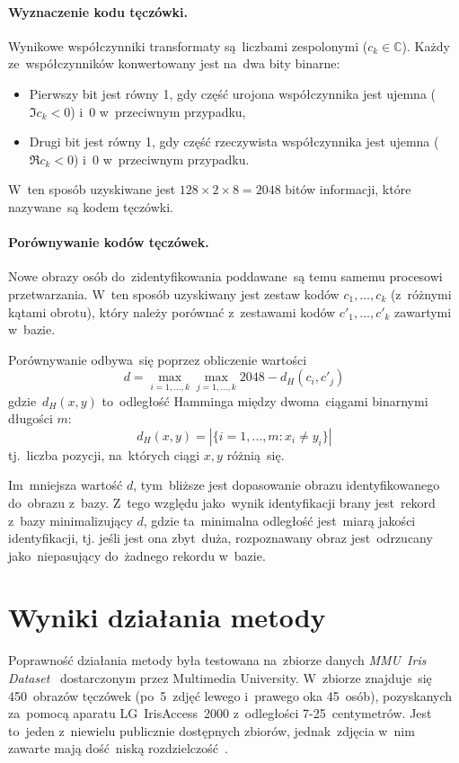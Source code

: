 \documentclass[11pt,a4paper]{article}
\begin{document}
\paragraph{Wyznaczenie kodu tęczówki.}
Wynikowe współczynniki transformaty są~liczbami zespolonymi ($c_k \in \mathbb{C}$).
Każdy ze~współczynników konwertowany jest na~dwa bity binarne:
\begin{itemize}
    \item Pierwszy bit jest równy 1, gdy część urojona współczynnika jest ujemna ($\Im c_k < 0$) i~0 w~przeciwnym przypadku,
    \item Drugi bit jest równy 1, gdy część rzeczywista współczynnika jest ujemna ($\Re c_k < 0$) i~0 w~przeciwnym przypadku.
\end{itemize}
W~ten sposób uzyskiwane jest $128 \times 2 \times 8 = 2048$ bitów informacji, które nazywane~są kodem tęczówki.

\paragraph{Porównywanie kodów tęczówek.}
Nowe obrazy osób do~zidentyfikowania poddawane~są temu samemu procesowi przetwarzania.
W~ten sposób uzyskiwany jest zestaw kodów $c_1, \dots, c_k$ (z~różnymi kątami obrotu), który należy porównać z~zestawami kodów $c'_1, \dots, c'_k$ zawartymi w~bazie.

Porównywanie odbywa~się poprzez obliczenie wartości
$$ d = \max_{i=1,\dots,k} \max_{j=1,\dots,k} 2048 - d_H(c_i, c'_j) $$
gdzie~$d_H(x, y)$ to~odległość Hamminga między dwoma~ciągami binarnymi długości $m$:
$$ d_H(x, y) = \left| \{ i=1,\dots,m : x_i \neq y_i \} \right| $$
tj.~liczba pozycji, na~których ciągi $x, y$ różnią~się.

Im~mniejsza wartość $d$, tym~bliższe jest dopasowanie obrazu identyfikowanego do~obrazu z~bazy.
Z~tego względu jako~wynik identyfikacji brany jest~rekord z~bazy minimalizujący $d$, gdzie ta~minimalna odległość jest~miarą jakości identyfikacji, tj. jeśli jest ona zbyt~duża, rozpoznawany obraz jest~odrzucany jako~niepasujący do~żadnego rekordu w~bazie.

\section{Wyniki działania metody}

Poprawność działania metody była testowana na~zbiorze danych \emph{MMU~Iris Dataset}~\cite{mmu} dostarczonym przez Multimedia University.
W~zbiorze znajduje~się 450~obrazów tęczówek (po~5~zdjęć lewego i~prawego oka 45~osób), pozyskanych za~pomocą aparatu LG~IrisAccess~2000 z~odległości 7-25~centymetrów.
Jest to~jeden z~niewielu publicznie dostępnych zbiorów, jednak~zdjęcia w~nim zawarte mają dość~niską rozdzielczość~\cite{zeng}.
\end{document}
